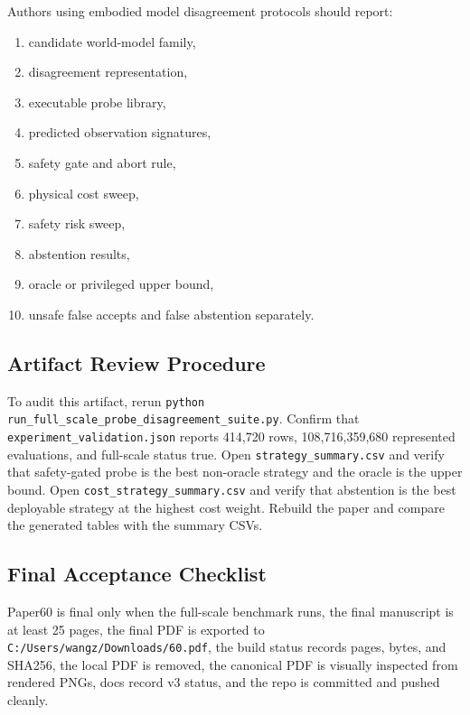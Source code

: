 \documentclass{article}
\begin{document}
Authors using embodied model disagreement protocols should report:
\begin{enumerate}
    \item candidate world-model family,
    \item disagreement representation,
    \item executable probe library,
    \item predicted observation signatures,
    \item safety gate and abort rule,
    \item physical cost sweep,
    \item safety risk sweep,
    \item abstention results,
    \item oracle or privileged upper bound,
    \item unsafe false accepts and false abstention separately.
\end{enumerate}

\subsection{Artifact Review Procedure}

To audit this artifact, rerun \texttt{python run\_full\_scale\_probe\_disagreement\_suite.py}. Confirm that \texttt{experiment\_validation.json} reports 414,720 rows, 108,716,359,680 represented evaluations, and full-scale status true. Open \texttt{strategy\_summary.csv} and verify that safety-gated probe is the best non-oracle strategy and the oracle is the upper bound. Open \texttt{cost\_strategy\_summary.csv} and verify that abstention is the best deployable strategy at the highest cost weight. Rebuild the paper and compare the generated tables with the summary CSVs.

\subsection{Final Acceptance Checklist}

Paper60 is final only when the full-scale benchmark runs, the final manuscript is at least 25 pages, the final PDF is exported to \texttt{C:/Users/wangz/Downloads/60.pdf}, the build status records pages, bytes, and SHA256, the local PDF is removed, the canonical PDF is visually inspected from rendered PNGs, docs record v3 status, and the repo is committed and pushed cleanly.
\end{document}
